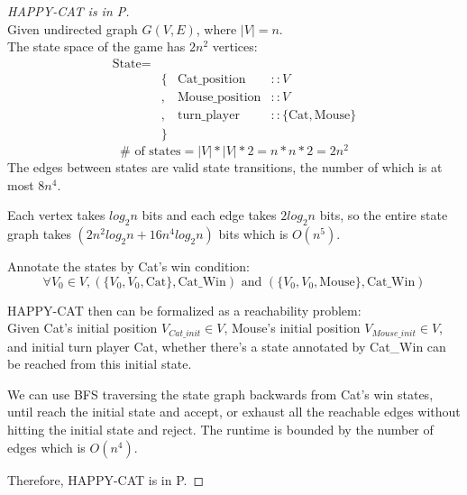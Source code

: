 \documentclass[twoside,11pt]{homework}
\begin{document}
\begin{solution}
\begin{proof}[HAPPY-CAT is in P]
  \ \\
  Given undirected graph $G(V,E)$, where $|V| = n$.\\
  The state space of the game has $2n^2$ vertices:
  \[
    \begin{aligned}
    \text{State} =&\\
      &\{ &\text{Cat\_position} &:: V\\
      &,  &\text{Mouse\_position} &:: V\\
      &,  &\text{turn\_player} &:: \{ \text{Cat}, \text{Mouse}\}\\
      &\}
    \end{aligned}
  \]
  \[
    \# \text{ of states} = |V| * |V| * 2 = n * n * 2 = 2n^2
  \]
  The edges between states are valid state transitions, the number of which is
  at most $8n^4$.

  Each vertex takes $log_2n$ bits and each edge takes $2log_2n$ bits, so the
  entire state graph takes $(2n^2log_2n + 16n^4log_2n)$ bits which is $O(n^5)$.

  Annotate the states by Cat's win condition:
  \[
    \forall V_0 \in V, (\{V_0, V_0, \text{Cat}\}, \text{Cat\_Win})
    \text{ and } 
    (\{V_0, V_0, \text{Mouse}\}, \text{Cat\_Win})
  \]

  HAPPY-CAT then can be formalized as a reachability problem:\\
  Given Cat's initial position $V_{Cat\_init} \in V$,
  Mouse's initial position $V_{Mouse\_init} \in V$,
  and initial turn player Cat, whether there's a state annotated by Cat\_Win can
  be reached from this initial state.

  We can use BFS traversing the state graph backwards from Cat's win states,
  until reach the initial state and accept, or exhaust all the reachable edges
  without hitting the initial state and reject.
  The runtime is bounded by the number of edges which is $O(n^4)$.

  Therefore, HAPPY-CAT is in P.
\end{proof}
\end{solution}
\end{document}
